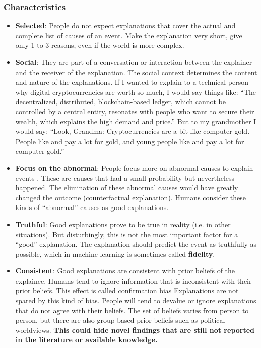 \subsubsection{Characteristics}
\begin{itemize}
    \item \textbf{Selected}: People do not expect explanations that cover the actual and complete list of causes of an event. Make the explanation very short, give only 1 to 3 reasons, even if the world is more complex.
    \item \textbf{Social}: They are part of a conversation or interaction between the explainer and the receiver of the explanation. The social context determines the content and nature of the explanations. If I wanted to explain to a technical person why digital cryptocurrencies are worth so much, I would say things like: “The decentralized, distributed, blockchain-based ledger, which cannot be controlled by a central entity, resonates with people who want to secure their wealth, which explains the high demand and price.” But to my grandmother I would say: “Look, Grandma: Cryptocurrencies are a bit like computer gold. People like and pay a lot for gold, and young people like and pay a lot for computer gold.”
    \item \textbf{Focus on the abnormal}: People focus more on abnormal causes to explain events \cite{Kahneman1982TheSH}. These are causes that had a small probability but nevertheless happened. The elimination of these abnormal causes would have greatly changed the outcome (counterfactual explanation). Humans consider these kinds of “abnormal” causes as good explanations. 
    \item \textbf{Truthful}: Good explanations prove to be true in reality (i.e. in other situations). But disturbingly, this is not the most important factor for a “good” explanation. The explanation should predict the event as truthfully as possible, which in machine learning is sometimes called \textbf{fidelity}.
    \item \textbf{Consistent}: Good explanations are consistent with prior beliefs of the explainee. Humans tend to ignore information that is inconsistent with their prior beliefs. This effect is called confirmation bias \cite{Nickerson1998}
    Explanations are not spared by this kind of bias. People will tend to devalue or ignore explanations that do not agree with their beliefs. The set of beliefs varies from person to person, but there are also group-based prior beliefs such as political worldviews.
    \textbf{This could hide novel findings that are still not reported in the literature or available knowledge.}

\end{itemize}
